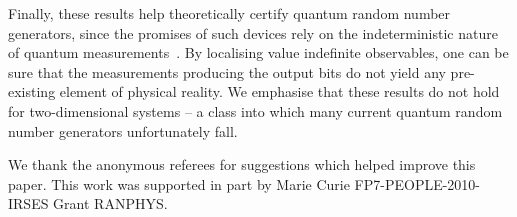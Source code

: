 \documentclass[%
 superscriptaddress,
 preprint,
 showpacs,
 showkeys,
 nofootinbib,
  amsmath,amssymb,
  aps,
  longbibliography,
  floatfix,
 ]{revtex4-1}
\theoremstyle{definition}
\begin{document}
Finally, these results help theoretically certify quantum random number generators, since the promises of such devices rely on the indeterministic nature of quantum measurements~\cite{Stefanov:2000aa}.
By localising value indefinite observables, one can be sure that the measurements producing the output bits do not yield any pre-existing element of physical reality.
We emphasise that these results do not hold for two-dimensional systems -- a class into which many current quantum random number generators unfortunately fall.

\begin{acknowledgments}
We thank the anonymous referees for suggestions which helped improve this paper.
This work was supported in part by Marie Curie FP7-PEOPLE-2010-IRSES Grant RANPHYS.
\end{acknowledgments}

%


\end{document}

